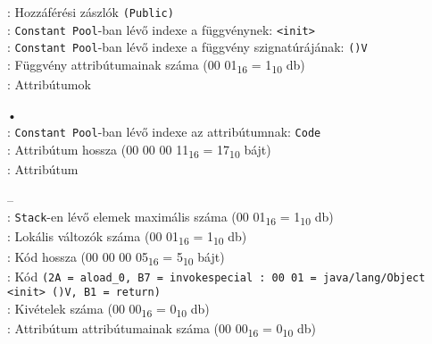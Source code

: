 \begin{compactitem}
\begin{compactitem}
    : Hozzáférési zászlók \lstinline{(Public)} \\
    : \lstinline{Constant Pool}-ban lévő indexe a függvénynek: \lstinline{<init>} \\
    : \lstinline{Constant Pool}-ban lévő indexe a függvény szignatúrájának: \lstinline{()V} \\
    : Függvény attribútumainak száma (00 01\textsubscript{16} = 1\textsubscript{10} db) \\
    : Attribútumok
    \begin{compactitem}
        \setlength\itemsep{-5px}
        \item[•]    \\
        : \lstinline{Constant Pool}-ban lévő indexe az attribútumnak: \lstinline{Code} \\
        : Attribútum hossza (00 00 00 11\textsubscript{16} = 17\textsubscript{10} bájt) \\
        : Attribútum
            \begin{compactitem}
            \setlength\itemsep{0px}
                \item[–]       \\
                : \lstinline{Stack}-en lévő elemek maximális száma (00 01\textsubscript{16} = 1\textsubscript{10} db) \\
                : Lokális változók száma (00 01\textsubscript{16} = 1\textsubscript{10} db) \\
                : Kód hossza (00 00 00 05\textsubscript{16} = 5\textsubscript{10} bájt) \\
                : Kód \lstinline{(2A = aload_0, B7 = invokespecial : 00 01 = java/lang/Object <init> ()V, B1 = return)}  \\
                : Kivételek száma (00 00\textsubscript{16} = 0\textsubscript{10} db) \\
                : Attribútum attribútumainak száma (00 00\textsubscript{16} = 0\textsubscript{10} db)

\end{compactitem}
\end{compactitem}
\end{compactitem}
\end{compactitem}
